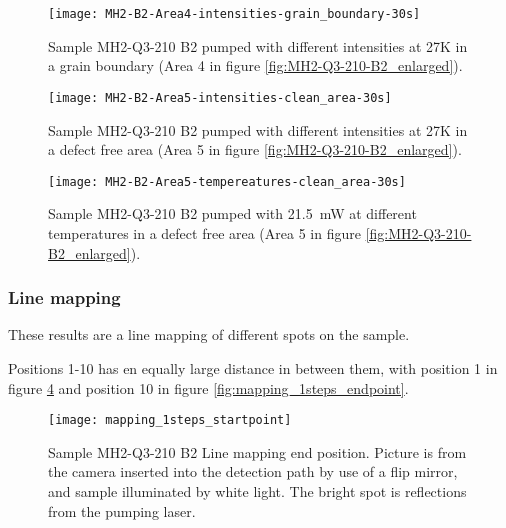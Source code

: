 \begin{figure}[H]
\centering
\texttt{[image: MH2-B2-Area4-intensities-grain\_boundary-30s]}
\caption[MH2-Q3-210 at area 4 with different intensities]{Sample MH2-Q3-210 B2 pumped with different intensities at 27K in a grain boundary (Area 4 in figure \ref{fig:MH2-Q3-210-B2_enlarged}).}
\label{fig:MH2-B2-Area4-intensities-grain_boundary-30s}%
\end{figure}


\begin{figure}[H]
\centering
\texttt{[image: MH2-B2-Area5-intensities-clean\_area-30s]}
\caption[MH2-Q3-210 at area 5 with different intensities]{Sample MH2-Q3-210 B2 pumped with different intensities at 27K in a defect free area (Area 5 in figure \ref{fig:MH2-Q3-210-B2_enlarged}).}
\label{fig:MH2-B2-Area5-intensities-clean_area-30s}%
\end{figure}


\begin{figure}[H]
\centering
\texttt{[image: MH2-B2-Area5-tempereatures-clean\_area-30s]}
\caption[MH2-Q3-210 at area 5 with different temperatures]{Sample MH2-Q3-210 B2 pumped with 21.5~mW at different temperatures in a defect free area (Area 5 in figure \ref{fig:MH2-Q3-210-B2_enlarged}).}
\label{fig:MH2-B2-Area5-tempereatures-clean_area-30s}%
\end{figure}







\subsubsection{Line mapping}

These results are a line mapping of different spots on the sample.

Positions 1-10 has en equally large distance in between them, with position 1 in figure \ref{fig:mapping_1steps_startpoint} and position 10 in figure \ref{fig:mapping_1steps_endpoint}.

\begin{figure}[H]
\centering
\texttt{[image: mapping\_1steps\_startpoint]}
\caption[MH2-Q3-210 line mapping start position]{Sample MH2-Q3-210 B2 Line mapping end position. Picture is from the camera inserted into the detection path by use of a flip mirror, and sample illuminated by white light. The bright spot is reflections from the pumping laser.}
\label{fig:mapping_1steps_startpoint}%
\end{figure}


